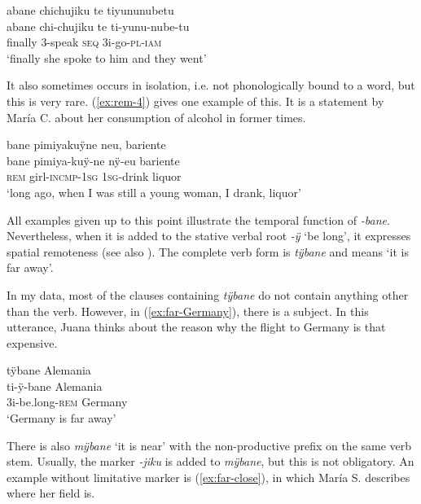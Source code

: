 \ea\label{ex:abane}
\begingl 
\glpreamble abane chichujiku te tiyununubetu\\
\gla abane chi-chujiku te ti-yunu-nube-tu\\ 
\glb finally 3-speak \textsc{seq} 3i-go-\textsc{pl}-\textsc{iam}\\ 
\glft ‘finally she spoke to him and they went’\\ 
\endgl
\trailingcitation{[jxx-p110923l-1.351]}
\xe

It also sometimes occurs in isolation, i.e. not phonologically bound to a word, but this is very rare. (\ref{ex:rem-4}) gives one example of this. It is a statement by María C. about her consumption of alcohol in former times.

\ea\label{ex:rem-4}
\begingl
\glpreamble bane pimiyakuÿne neu, bariente\\
\gla bane pimiya-kuÿ-ne nÿ-eu bariente\\
\glb \textsc{rem} girl-\textsc{incmp}-1\textsc{sg} 1\textsc{sg}-drink liquor\\
\glft ‘long ago, when I was still a young woman, I drank, liquor’
\endgl
\trailingcitation{[cux-c120414ls-1.031-032]}
\xe


All examples given up to this point illustrate the temporal function of \textit{-bane}. Nevertheless, when it is added to the stative verbal root \textit{-ÿ} ‘be long’, it expresses spatial remoteness (see also ). The complete verb form is \textit{tÿbane} and means ‘it is far away’.

In my data, most of the clauses containing \textit{tÿbane} do not contain anything other than the verb. However, in (\ref{ex:far-Germany}), there is a subject. In this utterance, Juana thinks about the reason why the flight to Germany is that expensive.

\ea\label{ex:far-Germany}
\begingl 
\glpreamble tÿbane Alemania\\
\gla ti-ÿ-bane Alemania\\ 
\glb 3i-be.long-\textsc{rem} Germany\\ 
\glft ‘Germany is far away’\\ 
\endgl
\trailingcitation{[jxx-p120430l-1.172]}
\xe


There is also \textit{mÿbane} ‘it is near’ with the non-productive  prefix on the same verb stem. Usually, the  marker \textit{-jiku} is added to \textit{mÿbane}, but this is not obligatory. An example without limitative marker is (\ref{ex:far-close}), in which María S. describes where her field is.

